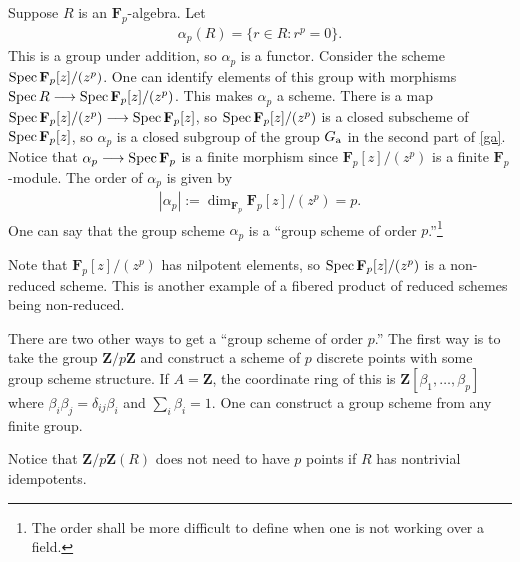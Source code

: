 \documentclass [11 pt, oneside] {article}
\begin{document}
\begin{example}[ ]\label{}\text{}
Suppose $R$ is an $\mathbf{F}_{p}$-algebra. Let 
\begin{align*}
	\alpha_p(R) = \{ r\in R : r^p =0\}.
\end{align*}
This is a group under addition, so $\alpha_p$ is a functor. Consider the scheme $\operatorname{Spec} \mathbf{F}_{p}[z]/(z^p)$. One can identify elements of this group with morphisms $\operatorname{Spec} R \longrightarrow \operatorname{Spec} \mathbf{F}_{p}[z]/(z^p)$. This makes $\alpha_p$ a scheme. There is a map $\operatorname{Spec} \mathbf{F}_{p}[z]/(z^p)\longrightarrow \operatorname{Spec} \mathbf{F}_{p}[z]$, so $\operatorname{Spec} \mathbf{F}_{p}[z]/(z^p)$ is a closed subscheme of $\operatorname{Spec} \mathbf{F}_{p}[z]$, so $\alpha_p$ is a closed subgroup of the group $G \textsubscript{a}$ in the second part of \cref{ga}. Notice that $\alpha_p \longrightarrow \operatorname{Spec} \mathbf{F}_{p}$ is a finite morphism since $\mathbf{F}_{p}[z]/(z^p)$ is a finite $\mathbf{F}_{p}$-module. The order of $\alpha_p$ is given by
\begin{align*}
	\left\lvert \alpha_p \right\rvert := \dim_{\mathbf{F}_{p}} \mathbf{F}_{p}[z]/(z^p) =p.
\end{align*}
One can say that the group scheme $\alpha_p$ is a ``group scheme of order $p$.''\footnote{The order shall be more difficult to define when one is not working over a field.}

Note that $\mathbf{F}_{p}[z]/(z^p)$ has nilpotent elements, so $\operatorname{Spec} \mathbf{F}_{p}[z]/(z^p)$ is a non-reduced scheme. This is another example of a fibered product of reduced schemes being non-reduced.
\end{example}

There are two other ways to get a ``group scheme of order $p$.'' The first way is to take the group $\mathbf{Z}/p\mathbf{Z}$ and construct a scheme of $p$ discrete points with some group scheme structure. If $A=\mathbf{Z}$, the coordinate ring of this is $\mathbf{Z}[\beta_1,\hdots, \beta_p]$ where $\beta_{i}\beta_j =\delta_{ij}\beta_i $ and $\sum_{i}^{} \beta_i=1$. One can construct a group scheme from any finite group.

\begin{remark}
	Notice that $\mathbf{Z}/p\mathbf{Z}(R)$ does not need to have $p$ points if $R$ has nontrivial idempotents.
\end{remark}
\end{document}
